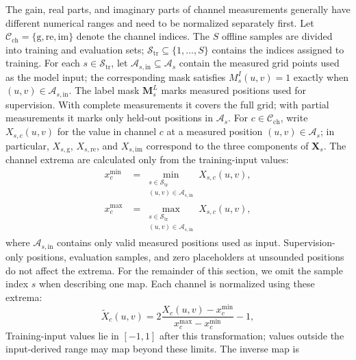 \documentclass[lettersize,journal]{IEEEtran}
\newcommand{\mat}[1]{\mathbf{#1}}
\begin{document}
The gain, real parts, and imaginary parts of channel measurements generally have different numerical ranges and need to be normalized separately first. Let $\mathcal{C}_{\mathrm{ch}}=\{\mathrm g,\mathrm{re},\mathrm{im}\}$ denote the channel indices. The $S$ offline samples are divided into training and evaluation sets; $\mathcal{S}_{\mathrm{tr}}\subseteq\{1,\ldots,S\}$ contains the indices assigned to training. For each $s\in\mathcal{S}_{\mathrm{tr}}$, let $\mathcal{A}_{s,\mathrm{in}}\subseteq\mathcal{A}_s$ contain the measured grid points used as the model input; the corresponding mask satisfies $M_s^{I}(u,v)=1$ exactly when $(u,v)\in\mathcal{A}_{s,\mathrm{in}}$. The label mask $\mat{M}_s^{L}$ marks measured positions used for supervision. With complete measurements it covers the full grid; with partial measurements it marks only held-out positions in $\mathcal{A}_s$. For $c\in\mathcal{C}_{\mathrm{ch}}$, write $X_{s,c}(u,v)$ for the value in channel $c$ at a measured position $(u,v)\in\mathcal{A}_s$; in particular, $X_{s,\mathrm g}$, $X_{s,\mathrm{re}}$, and $X_{s,\mathrm{im}}$ correspond to the three components of $\mat{X}_s$. The channel extrema are calculated only from the training-input values:
\begin{equation}
    \begin{aligned}
        x_c^{\min}
        &=\min_{\substack{s\in\mathcal{S}_{\mathrm{tr}}\\(u,v)\in\mathcal{A}_{s,\mathrm{in}}}}
        X_{s,c}(u,v), \\
        x_c^{\max}
        &=\max_{\substack{s\in\mathcal{S}_{\mathrm{tr}}\\(u,v)\in\mathcal{A}_{s,\mathrm{in}}}}
        X_{s,c}(u,v),
    \end{aligned}
    \label{eq:normalization_extrema}
\end{equation}
where $\mathcal{A}_{s,\mathrm{in}}$ contains only valid measured positions used as input. Supervision-only positions, evaluation samples, and zero placeholders at unsounded positions do not affect the extrema. For the remainder of this section, we omit the sample index $s$ when describing one map. Each channel is normalized using these extrema:
\begin{equation}
    \widetilde{X}_c(u,v)=2\frac{X_c(u,v)-x_c^{\min}}{x_c^{\max}-x_c^{\min}}-1,
    \label{eq:normalization}
\end{equation}
Training-input values lie in $[-1,1]$ after this transformation; values outside the input-derived range may map beyond these limits. The inverse map is
\end{document}
